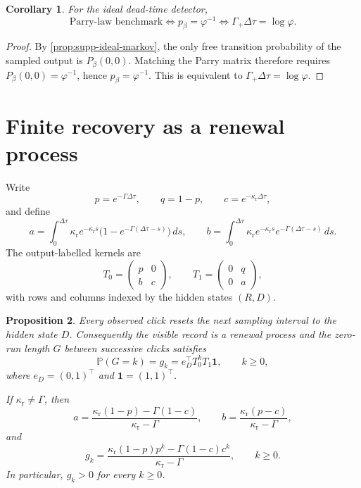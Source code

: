 \documentclass[11pt]{amsart}
\numberwithin{equation}{section}
\newtheorem{proposition}{Proposition}[section]
\newtheorem{corollary}[proposition]{Corollary}
\theoremstyle{remark}
\newcommand{\PP}{\mathbb{P}}
\begin{document}
\begin{corollary}\label{cor:supp-parry-threshold}
For the ideal dead-time detector,
\[
\text{Parry-law benchmark}
\iff p_\beta=\varphi^{-1}
\iff \Gamma_+\Delta\tau=\log\varphi.
\]
\end{corollary}

\begin{proof}
By \cref{prop:supp-ideal-markov}, the only free transition probability of the sampled output is $P_\beta(0,0)$. Matching the Parry matrix therefore requires $P_\beta(0,0)=\varphi^{-1}$, hence $p_\beta=\varphi^{-1}$. This is equivalent to $\Gamma_+\Delta\tau=\log\varphi$.
\end{proof}

\section{Finite recovery as a renewal process}\label{sec:supp-renewal}

Write
\[
p=e^{-\Gamma\Delta\tau},\qquad q=1-p,\qquad c=e^{-\kappa_{\mathrm r}\Delta\tau},
\]
and define
\begin{equation}\label{eq:supp-a-b}
a=\int_0^{\Delta\tau}\kappa_{\mathrm r}e^{-\kappa_{\mathrm r}s}\bigl(1-e^{-\Gamma(\Delta\tau-s)}\bigr)\,ds,
\qquad
b=\int_0^{\Delta\tau}\kappa_{\mathrm r}e^{-\kappa_{\mathrm r}s}e^{-\Gamma(\Delta\tau-s)}\,ds.
\end{equation}
The output-labelled kernels are
\begin{equation}\label{eq:supp-T0T1}
T_0=
\begin{pmatrix}
 p & 0 \\
 b & c
\end{pmatrix},
\qquad
T_1=
\begin{pmatrix}
 0 & q \\
 0 & a
\end{pmatrix},
\end{equation}
with rows and columns indexed by the hidden states $(R,D)$.

\begin{proposition}\label{prop:supp-renewal}
Every observed click resets the next sampling interval to the hidden state $D$. Consequently the visible record is a renewal process and the zero-run length $G$ between successive clicks satisfies
\begin{equation}\label{eq:supp-gap-law}
\PP(G=k)=g_k=e_D^{\top}T_0^kT_1\mathbf 1,\qquad k\ge0,
\end{equation}
where $e_D=(0,1)^{\top}$ and $\mathbf 1=(1,1)^{\top}$.

If $\kappa_{\mathrm r}\neq\Gamma$, then
\begin{equation}\label{eq:supp-a-b-closed}
a=\frac{\kappa_{\mathrm r}(1-p)-\Gamma(1-c)}{\kappa_{\mathrm r}-\Gamma},
\qquad
b=\frac{\kappa_{\mathrm r}(p-c)}{\kappa_{\mathrm r}-\Gamma},
\end{equation}
and
\begin{equation}\label{eq:supp-gap-closed}
g_k=
\frac{\kappa_{\mathrm r}(1-p)p^k-\Gamma(1-c)c^k}{\kappa_{\mathrm r}-\Gamma},
\qquad k\ge0.
\end{equation}
In particular, $g_k>0$ for every $k\ge0$.
\end{proposition}
\end{document}
